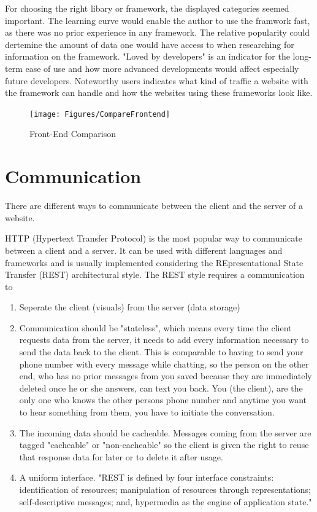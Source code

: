 For choosing the right libary or framework, the displayed categories seemed important.
The learning curve would enable the author to use the framwork fast, as there was no prior experience in any framework.
The relative popularity could dertemine the amount of data one would have access to when researching for information on the framework.
"Loved by developers" is an indicator for the long-term ease of use and how more advanced developments would affect especially future developers.
Noteworthy users indicates what kind of traffic a website with the framework can handle and how the websites using these frameworks look like.

\begin{figure}[b]
	\centering
    \texttt{[image: Figures/CompareFrontend]}
	\decoRule
	\caption[Front End Comparison]{Front-End Comparison}
	\label{fig:frontEndCompare}
\end{figure}

\section{Communication}
There are different ways to communicate between the client and the server of a website. 

HTTP (Hypertext Transfer Protocol) is the most popular way to communicate between a client and a server.
It can be used with different languages and frameworks and is usually implemented considering the REpresentational State Transfer (REST) architectural style.
The REST style requires a communication to 
\begin{enumerate}
    \item Seperate the client (visuals) from the server (data storage)
    \item 
    Communication should be "stateless", which means every time the client requests data from the server, 
    it needs to add every information necessary to send the data back to the client. 
    This is comparable to having to send your phone number with every message while chatting,
    so the person on the other end, who has no prior messages from you saved because they are immediately deleted once he or she answers, can text you back.
    You (the client), are the only one who knows the other persons phone number and anytime you want to hear something from them, you have to initiate the conversation.
    \item The incoming data should be cacheable. 
    Messages coming from the server are tagged "cacheable" or "non-cacheable" so the client is given the right to 
    reuse that response data for later or to delete it after usage.
    \item A uniform interface. 
    "REST is defined by four interface constraints: identification of resources; manipulation of resources through representations; self-descriptive messages; and, hypermedia as the engine of application state."
    \parencite{restful}
\end{enumerate}

